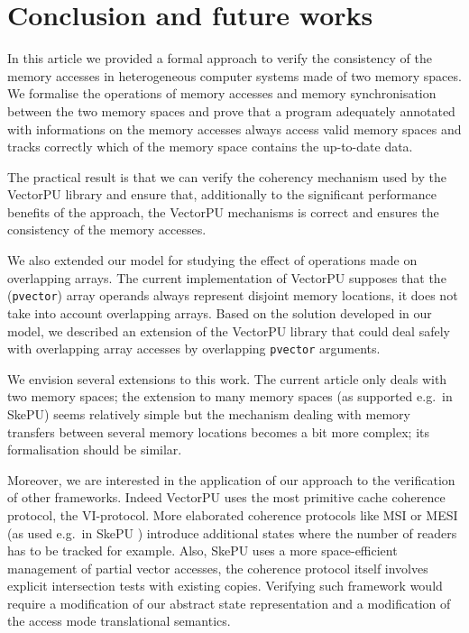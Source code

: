 \documentclass[preprint,12pt]{elsarticle}
\begin{document}
\section{Conclusion and future works}\label{sec:conclusion}
In this article we provided a formal approach to verify the consistency of the memory 
accesses in heterogeneous computer systems made of two memory spaces. We formalise the 
operations of memory accesses and memory synchronisation between the two memory spaces 
and prove that a program adequately annotated with informations on the memory accesses 
always access valid memory spaces and tracks correctly which of the memory space contains 
the up-to-date data.

The practical result is that we can verify the coherency mechanism used by the VectorPU 
library and ensure that, additionally to the significant performance benefits of the 
approach, the VectorPU mechanisms is correct and ensures the consistency of the memory 
accesses.

We also extended our model for studying the effect of
operations made on overlapping arrays.
The current implementation of VectorPU supposes that the 
(\texttt{pvector}) array operands always
represent disjoint memory locations, it does not 
take into account overlapping arrays. 
Based on the solution developed in our model,
we described an extension of the VectorPU library that could 
deal safely with overlapping array accesses by
overlapping \texttt{pvector} arguments.

We envision several extensions to this work.
The current article only deals with two memory spaces; the extension to many 
memory spaces (as supported e.g.\ in SkePU)
seems relatively simple but  the mechanism dealing 
with memory transfers between several memory locations becomes a bit more complex; its 
formalisation should be similar.

Moreover, we are interested in the application of our approach to the 
verification of other frameworks. 
Indeed VectorPU uses the most primitive
cache coherence protocol, the VI-protocol.
 More elaborated coherence protocols like MSI or MESI 
 (as used e.g.\ in SkePU \cite{Dastgeer-IJPP15}) 
 introduce additional states where the
 number of readers has to be tracked for example. 
 Also, SkePU uses a more space-efficient management of
 partial vector accesses, the
 coherence protocol itself involves explicit intersection tests with
 existing copies. 
 Verifying such framework would require 
 a modification of our abstract state representation and a modification of the access 
 mode translational semantics.
 
\end{document}
